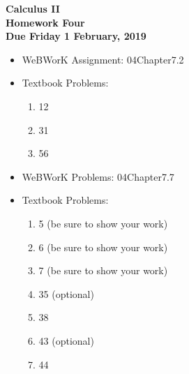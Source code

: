 \documentclass[12pt]{article}
\begin{document}
\pagestyle{empty}
 
\begin{center}
{\large {\bf Calculus II}}\\
\medskip
{\large {\bf Homework Four}}\\
\medskip
{ {\bf Due Friday 1 February, 2019}}\\
\end{center}



\begin{itemize}
  \item WeBWorK Assignment: 04Chapter7.2
  \item Textbook Problems:
    \begin{enumerate}
    \setlength{\itemsep}{-1mm}
    \item 12
    \item 31
    \item 56
\end{enumerate}
\end{itemize}




\begin{itemize}
  \item WeBWorK Problems: 04Chapter7.7
  \item Textbook Problems:
\begin{enumerate}
\setlength{\itemsep}{-1mm}
  \item 5 (be sure to show your work)
  \item 6 (be sure to show your work)
  \item 7 (be sure to show your work)
  \item 35 (optional)
  \item 38
  \item 43 (optional)
  \item 44
\end{enumerate}
\end{itemize}








\end{document}
